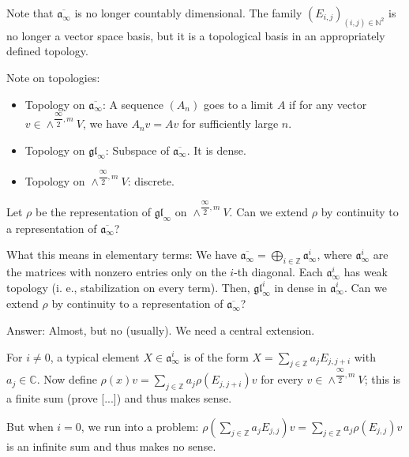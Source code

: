 \documentclass
[numbers=enddot,12pt,final,onecolumn,german,notitlepage]{scrartcl}%
\theoremstyle{definition}
\begin{document}
Note that $\overline{\mathfrak{a}_{\infty}}$ is no longer countably
dimensional. The family $\left(  E_{i,j}\right)  _{\left(  i,j\right)
\in\mathbb{N}^{2}}$ is no longer a vector space basis, but it is a topological
basis in an appropriately defined topology.

Note on topologies:

\begin{itemize}
\item Topology on $\overline{\mathfrak{a}_{\infty}}$: A sequence $\left(
A_{n}\right)  $ goes to a limit $A$ if for any vector $v\in\wedge
^{\dfrac{\infty}{2},m}V$, we have $A_{n}v=Av$ for sufficiently large $n$.

\item Topology on $\mathfrak{gl}_{\infty}$: Subspace of $\overline
{\mathfrak{a}_{\infty}}$. It is dense.

\item Topology on $\wedge^{\dfrac{\infty}{2},m}V$: discrete.
\end{itemize}

Let $\rho$ be the representation of $\mathfrak{gl}_{\infty}$ on $\wedge
^{\dfrac{\infty}{2},m}V$. Can we extend $\rho$ by continuity to a
representation of $\overline{\mathfrak{a}_{\infty}}$?

What this means in elementary terms: We have $\overline{\mathfrak{a}_{\infty}%
}=\bigoplus\limits_{i\in\mathbb{Z}}\mathfrak{a}_{\infty}^{i}$, where
$\mathfrak{a}_{\infty}^{i}$ are the matrices with nonzero entries only on the
$i$-th diagonal. Each $\mathfrak{a}_{\infty}^{i}$ has weak topology (i. e.,
stabilization on every term). Then, $\mathfrak{gl}_{\infty}^{i}$ in dense in
$\mathfrak{a}_{\infty}^{i}$. Can we extend $\rho$ by continuity to a
representation of $\overline{\mathfrak{a}_{\infty}}$?

Answer: Almost, but no (usually). We need a central extension.

For $i\neq0$, a typical element $X\in\mathfrak{a}_{\infty}^{i}$ is of the form
$X=\sum\limits_{j\in\mathbb{Z}}a_{j}E_{j,j+i}$ with $a_{j}\in\mathbb{C}$. Now
define $\rho\left(  x\right)  v=\sum\limits_{j\in\mathbb{Z}}a_{j}\rho\left(
E_{j,j+i}\right)  v$ for every $v\in\wedge^{\dfrac{\infty}{2},m}V$; this is a
finite sum (prove [...]) and thus makes sense.

But when $i=0$, we run into a problem: $\rho\left(  \sum\limits_{j\in
\mathbb{Z}}a_{j}E_{j,j}\right)  v=\sum\limits_{j\in\mathbb{Z}}a_{j}\rho\left(
E_{j,j}\right)  v$ is an infinite sum and thus makes no sense.
\end{document}
